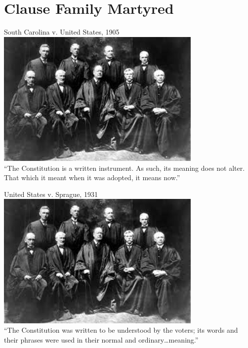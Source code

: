 




\unitlength=1pt

\section{Clause Family Martyred}
\frame{\mysectionpage}

\begin{frame}{South Carolina v. United States, 1905}
    \centering
    \includegraphics[width=0.75\textwidth]{img/sc-1905.png} \\
    ``The Constitution is a written instrument. As such, its meaning does not alter. That which it meant when it was adopted, it means now.'' \\
\end{frame}

\begin{frame}{United States v. Sprague, 1931}
    \centering
    \includegraphics[width=0.75\textwidth]{img/sc-1905.png} \\
    ``The Constitution was written to be understood by the voters; its words and their phrases were used in their normal and ordinary\ldots meaning.'' \\
\end{frame}

